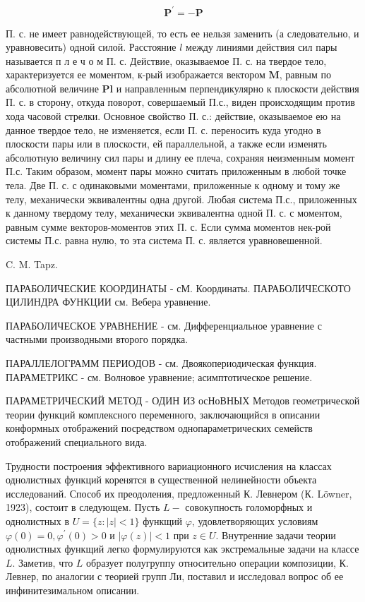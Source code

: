 \documentclass[10pt]{article}
\begin{document}
\[

\boldsymbol{P}^{\prime}=-\boldsymbol{P}

\]



П. с. не имеет равнодействующей, то есть ее нельзя заменить (а следовательно, и уравновесить) одной силой. Расстояние $l$ между линиями действия сил пары называется п л е ч о м П. с. Действие, оказываемое П. с. на твердое тело, характеризуется ее моментом, к-рый изображается вектором $\boldsymbol{M}$, равным по абсолютной величине $\boldsymbol{P l}$ и направленным перпендикулярно к плоскости действия П. с. в сторону, откуда поворот, совершаемый П.с., виден происходящим против хода часовой стрелки. Основное свойство П. с.: действие, оказываемое ею на данное твердое тело, не изменяется, если П. с. переносить куда угодно в плоскости пары или в плоскости, ей параллельной, а также если изменять абсолютную величину сил пары и длину ее плеча, сохраняя неизменным момент П.с. Таким образом, момент пары можно считать приложенным в любой точке тела. Две П. с. с одинаковыми моментами, приложенные к одному и тому же телу, механически эквивалентны одна другой. Любая система П.с., приложенных к данному твердому телу, механически эквивалентна одной П. с. с моментом, равным сумме векторов-моментов этих П. с. Если сумма моментов нек-рой системы П.с. равна нулю, то эта система П. с. является уравновешенной.



C. M. Tapz.



ПАРАБОЛИЧЕСКИЕ КООРДИНАТЫ - сМ. Координаты. ПАРАБОЛИЧЕСКОТО ЦИЛИНДРА ФУНКЦИИ см. Вебера уравнение.



ПАРАБОЛИЧЕСКОЕ УРАВНЕНИЕ - см. Дифференциальное уравнение с частными производными второго порядка.



ПАРАЛЛЕЛОГРАММ ПЕРИОДОВ - см. Двоякопериодическая функция. ПАРАМЕТРИКС - см. Волновое уравнение; асимптотическое решение.



ПАРАМЕТРИЧЕСКИЙ МЕТОД - ОДИН ИЗ осНоВНЫХ Методов геометрической теории функций комплексного переменного, заключающийся в описании конформных отображений посредством однопараметрических семейств отображений специального вида.



Трудности построения эффективного вариационного исчисления на классах однолистных функций коренятся в существенной нелинейности объекта исследований. Способ их преодоления, предложенный К. Левнером (К. Löwner, 1923), состоит в следующем. Пусть $L-$ совокупность голоморфных и однолистных в $U=\{z:|z|<1\}$ функщий $\varphi$, удовлетворяющих условиям $\varphi(0)=0, \varphi^{\prime}(0)>0$ и $|\varphi(z)|<1$ при $z \in U$. Внутренние задачи теории однолистных функщий легко формулируются как экстремальные задачи на классе $L$. Заметив, что $L$ образует полугруппу относительно операции композиции, К. Левнер, по аналогии с теорией групп Ли, поставил и исследовал вопрос об ее инфинитезимальном описании.
\end{document}
